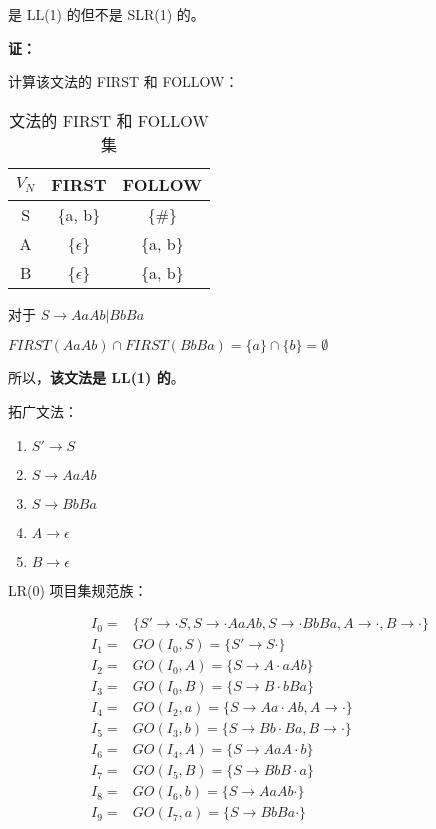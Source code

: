\begin{enumerate}
    是 LL(1) 的但不是 SLR(1) 的。
    
    \textbf{证：}
    
    计算该文法的 FIRST 和 FOLLOW：
    
    \begin{table}[H]
        \centering
        \begin{tabular}{c|cc}
            $V_N$ & FIRST & FOLLOW \\
            \hline
            S & \{a, b\} & \{\#\} \\
            A & \{$\epsilon$\} & \{a, b\} \\
            B & \{$\epsilon$\} & \{a, b\} \\
        \end{tabular}
        \caption{文法的 FIRST 和 FOLLOW 集}
        \label{tab:FF_8}
    \end{table}
    
    对于 $S \to AaAb | BbBa $
    
    $ FIRST(AaAb) \cap FIRST(BbBa) = \{a\} \cap \{b\} = \emptyset $
    
    所以，\textbf{该文法是 LL(1) 的}。
    
    拓广文法：
    
    \begin{enumerate}[(1)]
        \item $S' \to S$
        \item $S \to AaAb$
        \item $S \to BbBa$
        \item $A \to \epsilon$
        \item $B \to \epsilon$
    \end{enumerate}
    
    LR(0) 项目集规范族：
    
    \begin{equation*}
        \begin{array}{cl}
            I_0 = & \{S' \to \cdot S, S \to \cdot AaAb, S \to \cdot BbBa, A \to \cdot, B \to \cdot \} \\
            \hline
            I_1 = & GO(I_0, S) = \{S' \to S \cdot \} \\
            I_2 = & GO(I_0, A) = \{S \to A \cdot aAb \} \\
            I_3 = & GO(I_0, B) = \{S \to B \cdot bBa \} \\
            \hline
            I_4 = & GO(I_2, a) = \{S \to Aa \cdot Ab, A \to \cdot\} \\
            \hline
            I_5 = & GO(I_3, b) = \{S \to Bb \cdot Ba, B \to \cdot\} \\
            \hline
            I_6 = & GO(I_4, A) = \{S \to AaA \cdot b\} \\
            \hline
            I_7 = & GO(I_5, B) = \{S \to BbB \cdot a\} \\
            \hline
            I_8 = & GO(I_6, b) = \{S \to AaAb \cdot\} \\
            \hline
            I_9 = & GO(I_7, a) = \{S \to BbBa \cdot\} \\
        \end{array}
    \end{equation*}
    

\end{enumerate}
